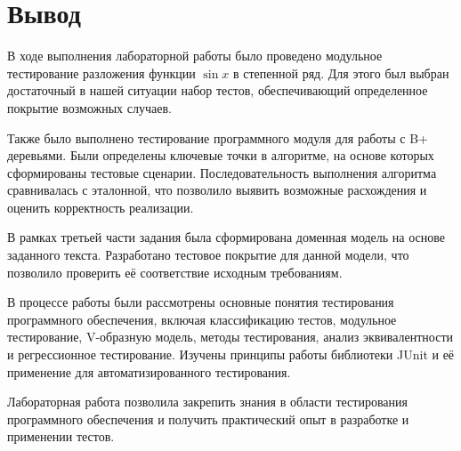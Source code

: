\section{Вывод}
В ходе выполнения лабораторной работы было проведено модульное тестирование
разложения функции \(\sin x\) в степенной ряд.
Для этого был выбран достаточный в нашей ситуации набор тестов,
обеспечивающий определенное покрытие возможных случаев.

Также было выполнено тестирование программного модуля для работы с B+ деревьями.
Были определены ключевые точки в алгоритме,
на основе которых сформированы тестовые сценарии.
Последовательность выполнения алгоритма сравнивалась с эталонной,
что позволило выявить возможные расхождения и оценить корректность реализации.

В рамках третьей части задания была сформирована доменная модель на основе заданного текста.
Разработано тестовое покрытие для данной модели, что позволило проверить её соответствие исходным требованиям.

В процессе работы были рассмотрены основные понятия тестирования программного обеспечения,
включая классификацию тестов, модульное тестирование, V-образную модель, методы тестирования,
анализ эквивалентности и регрессионное тестирование.
Изучены принципы работы библиотеки JUnit и её применение для автоматизированного тестирования.

Лабораторная работа позволила закрепить знания в области тестирования программного обеспечения и
получить практический опыт в разработке и применении тестов.
